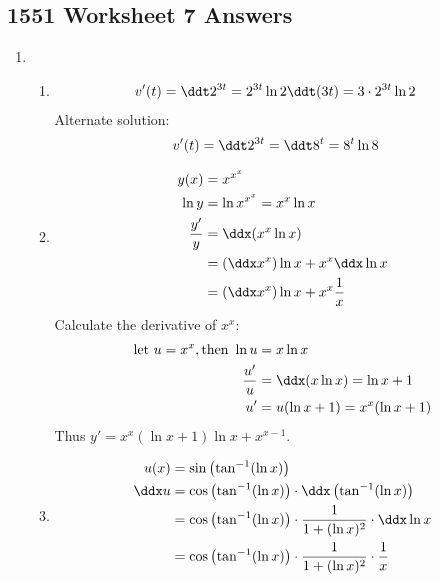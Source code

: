 \newpage\subsection*{1551 Worksheet 7 Answers}

\SolutionsStatement

\begin{enumerate}
    
    \item \begin{enumerate}
    
    \item \begin{align*}
    	v'(t) &= \ddt 2^{3t} 
        = 2^{3t} \ln 2 \ddt (3t)  
        = 3\cdot 2^{3t} \ln 2
    \end{align*}
    Alternate solution: 
    \begin{align*}
    	v'(t) &= \ddt 2^{3t}
        = \ddt 8^t 
        = 8^t \ln 8
    \end{align*}
    
    	\item 
    	\begin{align*} 
    		y(x) &= x^{x^{x}} \\
    		\ln y&= \ln x^{x^{x}} =x^x \ln x \\
     		\frac{y'}{y} &= \ddx (x^x \ln x) \\
     		&= ( \ddx x^x ) \ln x + x^x \ddx \ln x \\
     		&= ( \ddx x^x ) \ln x + x^x \frac 1 x 
    	\end{align*}
    	Calculate the derivative of $x^x$: 
        \begin{align*}
        	\text{let } u = x^x, \text{then } \ln u &= x \ln x \\
            \frac{u'}{u} &= \ddx ( x \ln x) = \ln x + 1 \\
            u' &= u(\ln x + 1) 
            = x^x (\ln x + 1) 
        \end{align*}
        Thus $y'= x^x (\ln x + 1) \ln x + x^{x-1}$. 

        
        
        \item \begin{align*} 
        	u(x) &= \sin\left(\tan^{-1} (\ln x)\right) \\
            \ddx u 
            &= \cos\left(\tan^{-1} (\ln x)\right) \cdot 
            \ddx \left(\tan^{-1} (\ln x)\right) \\
            &= \cos\left(\tan^{-1} (\ln x)\right) \cdot 
            \frac{1}{1+ (\ln x)^2} \cdot \ddx \ln x \\    
            &= \cos\left(\tan^{-1} (\ln x)\right) \cdot 
            \frac{1}{1+ (\ln x)^2} \cdot \frac 1 x            
        \end{align*}
        

\end{enumerate}
\end{enumerate}
